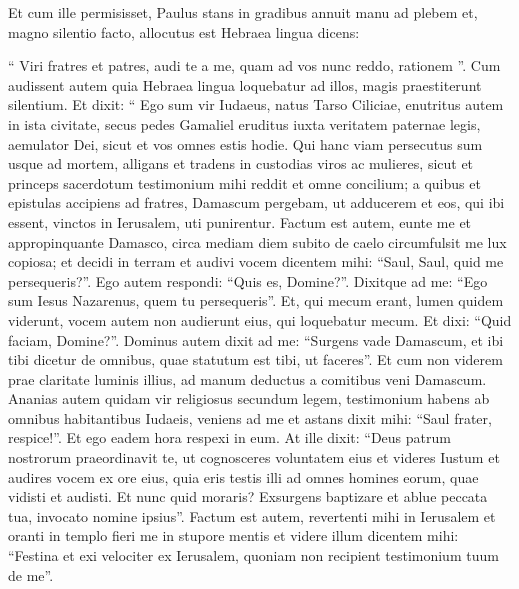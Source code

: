 \begin{biblechapter}
\begin{biblechapter}
\begin{biblechapter}
\begin{biblechapter}
\begin{biblechapter}
\begin{biblechapter}
\begin{biblechapter}
\begin{biblechapter}
\begin{biblechapter}
\begin{biblechapter}
\begin{biblechapter}
\begin{biblechapter}
\begin{biblechapter}
\begin{biblechapter}
\begin{biblechapter}
\begin{biblechapter}
\begin{biblechapter}
\begin{biblechapter}
\begin{biblechapter}
\begin{biblechapter}
\begin{biblechapter}
\verse Et cum ille permisisset, Paulus stans in gradibus annuit manu ad plebem et, magno silentio facto, allocutus est Hebraea lingua dicens:
 
\begin{biblechapter}
\verse “ Viri fratres et patres, audi te a me, quam ad vos nunc reddo, rationem ”. \verse Cum audissent autem quia Hebraea lingua loquebatur ad illos, magis praestiterunt silentium. Et dixit: 
\verse “ Ego sum vir Iudaeus, natus Tarso Ciliciae, enutritus autem in ista civitate, secus pedes Gamaliel eruditus iuxta veritatem paternae legis, aemulator Dei, sicut et vos omnes estis hodie. 
\verse Qui hanc viam persecutus sum usque ad mortem, alligans et tradens in custodias viros ac mulieres, 
\verse sicut et princeps sacerdotum testimonium mihi reddit et omne concilium; a quibus et epistulas accipiens ad fratres, Damascum pergebam, ut adducerem et eos, qui ibi essent, vinctos in Ierusalem, uti punirentur.
 \verse Factum est autem, eunte me et appropinquante Damasco, circa mediam diem subito de caelo circumfulsit me lux copiosa; 
\verse et decidi in terram et audivi vocem dicentem mihi: “Saul, Saul, quid me persequeris?”. 
\verse Ego autem respondi: “Quis es, Domine?”. Dixitque ad me: “Ego sum Iesus Nazarenus, quem tu persequeris”. 
\verse Et, qui mecum erant, lumen quidem viderunt, vocem autem non audierunt eius, qui loquebatur mecum. 
\verse Et dixi: “Quid faciam, Domine?”. Dominus autem dixit ad me: “Surgens vade Damascum, et ibi tibi dicetur de omnibus, quae statutum est tibi, ut faceres”. 
\verse Et cum non viderem prae claritate luminis illius, ad manum deductus a comitibus veni Damascum.
 \verse Ananias autem quidam vir religiosus secundum legem, testimonium habens ab omnibus habitantibus Iudaeis, 
\verse veniens ad me et astans dixit mihi: “Saul frater, respice!”. Et ego eadem hora respexi in eum. 
\verse At ille dixit: “Deus patrum nostrorum praeordinavit te, ut cognosceres voluntatem eius et videres Iustum et audires vocem ex ore eius, 
\verse quia eris testis illi ad omnes homines eorum, quae vidisti et audisti. 
\verse Et nunc quid moraris? Exsurgens baptizare et ablue peccata tua, invocato nomine ipsius”.
 \verse Factum est autem, revertenti mihi in Ierusalem et oranti in templo fieri me in stupore mentis 
\verse et videre illum dicentem mihi: “Festina et exi velociter ex Ierusalem, quoniam non recipient testimonium tuum de me”. 

\end{biblechapter}
\end{biblechapter}
\end{biblechapter}
\end{biblechapter}
\end{biblechapter}
\end{biblechapter}
\end{biblechapter}
\end{biblechapter}
\end{biblechapter}
\end{biblechapter}
\end{biblechapter}
\end{biblechapter}
\end{biblechapter}
\end{biblechapter}
\end{biblechapter}
\end{biblechapter}
\end{biblechapter}
\end{biblechapter}
\end{biblechapter}
\end{biblechapter}
\end{biblechapter}
\end{biblechapter}
